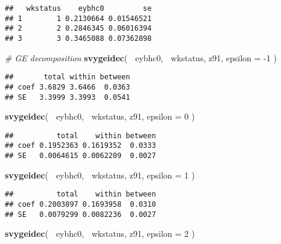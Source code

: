 \documentclass[]{book}
\newenvironment{Shaded}{\begin{snugshade}}{\end{snugshade}}
\newcommand{\CommentTok}[1]{\textcolor[rgb]{0.56,0.35,0.01}{\textit{#1}}}
\newcommand{\DataTypeTok}[1]{\textcolor[rgb]{0.13,0.29,0.53}{#1}}
\newcommand{\DecValTok}[1]{\textcolor[rgb]{0.00,0.00,0.81}{#1}}
\newcommand{\KeywordTok}[1]{\textcolor[rgb]{0.13,0.29,0.53}{\textbf{#1}}}
\newcommand{\NormalTok}[1]{#1}
\newcommand{\OperatorTok}[1]{\textcolor[rgb]{0.81,0.36,0.00}{\textbf{#1}}}
\begin{document}
\begin{verbatim}
##   wkstatus    eybhc0         se
## 1        1 0.2130664 0.01546521
## 2        2 0.2846345 0.06016394
## 3        3 0.3465088 0.07362898
\end{verbatim}

\begin{Shaded}
\begin{Highlighting}[]
\CommentTok{# GE decomposition}
\KeywordTok{svygeidec}\NormalTok{( }\OperatorTok{~}\NormalTok{eybhc0, }\OperatorTok{~}\NormalTok{wkstatus, z91, }\DataTypeTok{epsilon =} \DecValTok{-1}\NormalTok{ )}
\end{Highlighting}
\end{Shaded}

\begin{verbatim}
##       total within between
## coef 3.6829 3.6466  0.0363
## SE   3.3999 3.3993  0.0541
\end{verbatim}

\begin{Shaded}
\begin{Highlighting}[]
\KeywordTok{svygeidec}\NormalTok{( }\OperatorTok{~}\NormalTok{eybhc0, }\OperatorTok{~}\NormalTok{wkstatus, z91, }\DataTypeTok{epsilon =} \DecValTok{0}\NormalTok{ )}
\end{Highlighting}
\end{Shaded}

\begin{verbatim}
##          total    within between
## coef 0.1952363 0.1619352  0.0333
## SE   0.0064615 0.0062209  0.0027
\end{verbatim}

\begin{Shaded}
\begin{Highlighting}[]
\KeywordTok{svygeidec}\NormalTok{( }\OperatorTok{~}\NormalTok{eybhc0, }\OperatorTok{~}\NormalTok{wkstatus, z91, }\DataTypeTok{epsilon =} \DecValTok{1}\NormalTok{ )}
\end{Highlighting}
\end{Shaded}

\begin{verbatim}
##          total    within between
## coef 0.2003897 0.1693958  0.0310
## SE   0.0079299 0.0082236  0.0027
\end{verbatim}

\begin{Shaded}
\begin{Highlighting}[]
\KeywordTok{svygeidec}\NormalTok{( }\OperatorTok{~}\NormalTok{eybhc0, }\OperatorTok{~}\NormalTok{wkstatus, z91, }\DataTypeTok{epsilon =} \DecValTok{2}\NormalTok{ )}
\end{Highlighting}
\end{Shaded}
\end{document}
